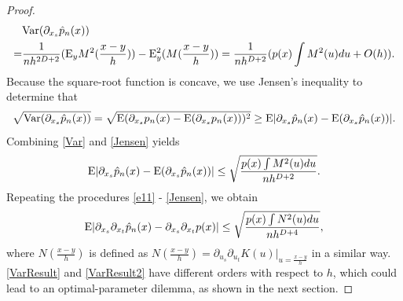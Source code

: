 \documentclass[aos,preprint]{imsart}
\theoremstyle{remark}
\begin{document}
\begin{appendix}
\begin{proof}
\begin{equation}
\begin{aligned}
  & {\rm Var} (\partial_{x_s} \hat{p}_n(x))  \\
=& \frac{1}{n h^{2D+2}}({\rm E}_yM^2(\frac{x-y}{h}))-{\rm E}^2_y(M(\frac{x-y}{h})) = \frac{1}{n h^{D+2}} (p(x)\int M^2(u)du +O(h)).
\end{aligned}
\end{equation}
Because the square-root function is concave, we use Jensen's inequality to determine that
\begin{equation}\label{Jensen}
\sqrt{{\rm Var}(\partial_{x_s}\hat{p}_n(x))} = \sqrt{{\rm E}(\partial_{x_s} p_n(x)-{\rm E}(\partial_{x_s} p_n(x)))^2}\geq {\rm E} |\partial_{x_s} \hat{p}_n(x)-{\rm E}(\partial_{x_s} \hat{p}_n(x))|.
\end{equation}
Combining \eqref{Var} and \eqref{Jensen} yields
\begin{equation}\label{VarResult}
{\rm E} |\partial_{x_s} \hat{p}_n(x)-{\rm E}(\partial_{x_s} \hat{p}_n(x))| \leq \sqrt{\frac{p(x)\int M^2(u)du}{n h^{D+2}}}.
\end{equation}
Repeating the procedures \eqref{e11} - \eqref{Jensen},  we obtain
\begin{equation}\label{VarResult2}
{\rm E} | \partial_{x_s}\partial_{x_t} \hat{p}_n(x) -\partial_{x_s}\partial_{x_t} p(x)| \leq \sqrt{\frac{p(x)\int N^2(u)du}{nh^{D+4}}},
\end{equation}
where $N(\frac{x-y}{h}) $ is defined as $N(\frac{x-y}{h}) = \partial_ {u_s}\partial_{u_t}  K(u)|_{u=\frac{x-y}{h}}$ in a similar way.
\eqref{VarResult} and \eqref{VarResult2} have different orders with respect to $h$, which could lead to an optimal-parameter dilemma, as shown in the next section.
\end{proof}

\end{appendix}
\end{document}
